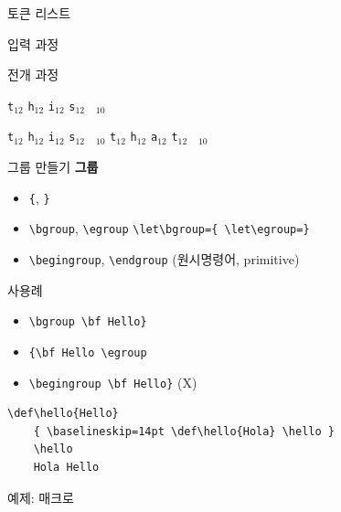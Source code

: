 \documentclass{beamer}
\begin{document}
%
\begin{frame}[fragile]{토큰 리스트}
\begin{verbatim*}
\def\tokentwo{\iftrue this \else that \fi}
\def\tokenone#1{...}
\expandafter\tokenone\tokentwo
\end{verbatim*}
    \bigskip

    \alert{입력 과정}
    
    \quad
    \quad
    
    \bigskip
    \alert{전개 과정}

    \quad
    \verb|t|$_{12}$\quad
    \verb|h|$_{12}$\quad
    \verb|i|$_{12}$\quad
    \verb|s|$_{12}$\quad
    \verb*| |$_{10}$

    \bigskip
    \quad
    \quad
    \verb|t|$_{12}$\quad
    \verb|h|$_{12}$\quad
    \verb|i|$_{12}$\quad
    \verb|s|$_{12}$\quad
    \verb*| |$_{10}$\quad
    \quad
    \verb|t|$_{12}$\quad
    \verb|h|$_{12}$\quad
    \verb|a|$_{12}$\quad
    \verb|t|$_{12}$\quad
    \verb*| |$_{10}$\quad
\end{frame}


%
\begin{frame}[fragile]{그룹 만들기}
  \textbf{\alert{그룹}}
  \begin{itemize}
  \item \verb+{+, \verb+}+
  \item \verb+\bgroup+, \verb+\egroup+
    {\color{blue}\small \verb+\let\bgroup={ \let\egroup=}+}
  \item \verb+\begingroup+, \verb+\endgroup+ (원시명령어, primitive)
  \end{itemize}
  \alert{사용례}
  \begin{itemize}
  \item \verb+\bgroup \bf Hello}+
  \item \verb+{\bf Hello \egroup+
  \item \verb+\begingroup \bf Hello}+ {\color{red} (X)}
  \end{itemize}
\begin{Verbatim}[fontsize=\small, formatcom=\color{blue}]
    \def\hello{Hello}
    { \baselineskip=14pt \def\hello{Hola} \hello }
    \hello
    Hola Hello
\end{Verbatim}
\end{frame}


%
\begin{frame}[standout]
  예제: \texttt{\string\bold} 매크로
\end{frame}
\end{document}
